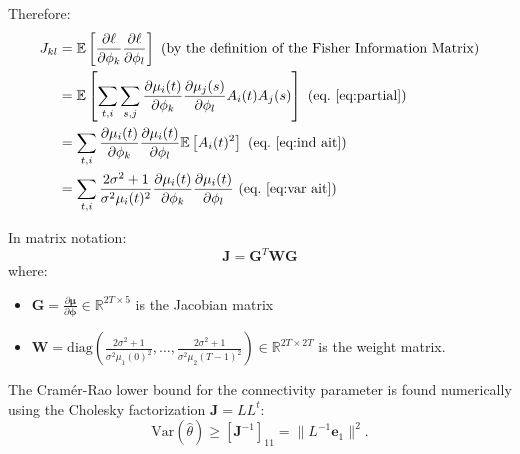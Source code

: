 Therefore:
\begin{align}
  \begin{split}
  J_{kl} &= \mathbb{E}\left[\frac{\partial \ell}{\partial \phi_k}
    \frac{\partial \ell}{\partial \phi_l}\right] \text{ (by the definition of
    the Fisher Information Matrix)}\\
  &= \mathbb{E} \left [\sum_{t,i} \sum_{s,j} \frac{\partial
      \mu_i(t)}{\partial \phi_k} \frac{\partial \mu_j(s)}{\partial
      \phi_l} A_i(t) A_j(s) \right ] \text{ (eq.~\eqref{eq:partial})} \\
  &= \sum_{t,i} \frac{\partial \mu_i(t)}{\partial
    \phi_k}\frac{\partial \mu_i(t)}{\partial \phi_l} \mathbb{E} \left
  [A_i(t)^2 \right ] \text{ (eq.~\eqref{eq:ind ait})}\\
  &= \sum_{t,i} \frac{2\sigma^2+1}{\sigma^2\mu_i(t)^2}\frac{\partial \mu_i(t)}{\partial
    \phi_k}\frac{\partial \mu_i(t)}{\partial \phi_l}  \text{ (eq.~\eqref{eq:var ait})}\\
  \end{split}
\end{align}


In matrix notation:
\begin{equation*}
\mathbf{J} = \mathbf{G}^T \mathbf{W} \mathbf{G}
\end{equation*}
where:
\begin{itemize}
\item $\mathbf{G} = \frac{\partial \boldsymbol{\mu}}{\partial \boldsymbol{\phi}} \in \mathbb{R}^{2T \times 5}$ is the Jacobian matrix
\item $\mathbf{W} = \text{diag}(\frac{2\sigma^2 + 1}{\sigma^2\mu_1(0)^2}, \ldots, \frac{2\sigma^2 + 1}{\sigma^2\mu_2(T-1)^2}) \in \mathbb{R}^{2T \times 2T}$ is the weight matrix.
\end{itemize}


The Cramér-Rao lower bound for the connectivity parameter is found
numerically using the Cholesky factorization $\mathbf{J} = LL^t$:
\begin{equation*}
\text{Var}(\hat{\theta}) \geq [\mathbf{J}^{-1}]_{11} = \|L^{-1}\mathbf{e}_1\|^2.
\end{equation*}
